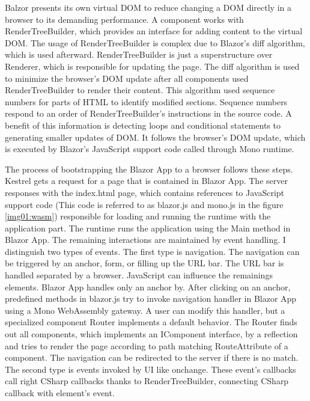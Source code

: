 
Balzor presents its own virtual DOM to reduce changing a DOM directly in a browser to its demanding performance.
A component works with RenderTreeBuilder, which provides an interface for adding content to the virtual DOM.
The usage of RenderTreeBuilder is complex due to Blazor's diff algorithm, which is used afterward.
RenderTreeBuilder is just a superstructure over Renderer, which is responsible for updating the page.
The diff algorithm is used to minimize the browser's DOM  update after all components used RenderTreeBuilder to render their content.
This algorithm used sequence numbers for parts of HTML to identify modified sections.
Sequence numbers respond to an order of RenderTreeBuilder's instructions in the source code.
A benefit of this information is detecting loops and conditional statements to generating smaller updates of DOM.  
It follows the browser's DOM update, which is executed by Blazor's JavaScript support code called through Mono runtime.

The process of bootstrapping the Blazor App to a browser follows these steps. 
Kestrel gets a request for a page that is contained in Blazor App. 
The server responses with the index.html page, which contains references to JavaScript support code (This code is referred to as blazor.js and mono.js in the figure \ref{img01:wasm}) responsible for loading and running the runtime with the application part.
The runtime runs the application using the Main method in Blazor App.
The remaining interactions are maintained by event handling.
I distinguish two types of events.
The first type is navigation.
The navigation \cite{14} can be triggered by an anchor, form, or filling up the URL bar.
The URL bar is handled separated by a browser.
JavaScript can influence the remainings elements.
Blazor App handles only an anchor by.
After clicking on an anchor, predefined methods in blazor.js try to invoke navigation handler in Blazor App using a Mono WebAssembly gateway.
A user can modify this handler, but a specialized component Router implements a default behavior.
The Router finds out all components, which implements an IComponent interface, by a reflection and tries to render the page according to path matching RouteAttribute of a component.
The navigation can be redirected to the server if there is no match.
The second type is events invoked by UI like onchange. These event's callbacks call right CSharp callbacks thanks to RenderTreeBuilder, connecting CSharp callback with element's event.

